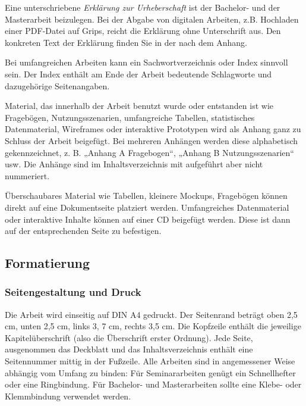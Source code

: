 
Eine unterschriebene \textit{Erklärung zur Urheberschaft} ist der Bachelor- und der Masterarbeit beizulegen. Bei der Abgabe von digitalen Arbeiten, z.B. Hochladen einer PDF-Datei auf Grips, reicht die Erklärung ohne Unterschrift aus. Den konkreten Text der Erklärung finden Sie in der nach dem Anhang. 


Bei umfangreichen Arbeiten kann ein Sachwortverzeichnis oder Index sinnvoll sein. Der Index enthält am Ende der Arbeit bedeutende Schlagworte und dazugehörige Seitenangaben.


Material, das innerhalb der Arbeit benutzt wurde oder entstanden ist wie Fragebögen, Nutzungsszenarien, umfangreiche Tabellen, statistisches Datenmaterial, Wireframes oder interaktive Prototypen wird als Anhang ganz zu Schluss der Arbeit beigefügt. Bei mehreren Anhängen werden diese alphabetisch gekennzeichnet, z. B. „Anhang A Fragebogen“, „Anhang B Nutzungsszenarien“ usw. Die Anhänge sind im Inhaltsverzeichnis mit aufgeführt aber nicht nummeriert.

Überschaubares Material wie Tabellen, kleinere Mockups, Fragebögen können direkt auf eine Dokumentseite platziert werden. Umfangreiches Datenmaterial oder interaktive Inhalte können auf einer CD beigefügt werden. Diese ist dann auf der entsprechenden Seite zu befestigen. 

\subsection{Formatierung}\label{subsec:formatierung}

\subsubsection{Seitengestaltung und Druck}\label{subsubsec:seitengestaltung}

Die Arbeit wird einseitig auf DIN A4 gedruckt. Der Seitenrand beträgt oben 2,5 cm, unten 2,5 cm, links 3, 7 cm, rechts 3,5 cm. Die Kopfzeile enthält die jeweilige Kapitelüberschrift (also die Überschrift erster Ordnung). Jede Seite, ausgenommen das Deckblatt und das Inhaltsverzeichnis enthält eine Seitennummer mittig in der Fußzeile. Alle Arbeiten sind in angemessener Weise abhängig vom Umfang zu binden: Für Seminararbeiten genügt ein Schnellhefter oder eine Ringbindung. Für Bachelor- und Masterarbeiten sollte eine Klebe- oder Klemmbindung verwendet werden.

